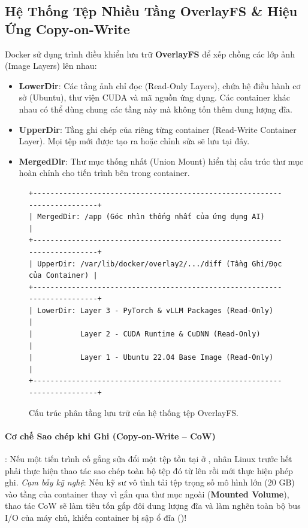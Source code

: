 \subsection{Hệ Thống Tệp Nhiều Tầng OverlayFS \& Hiệu Ứng Copy-on-Write}
Docker sử dụng trình điều khiển lưu trữ \textbf{OverlayFS} để xếp chồng các lớp ảnh (Image Layers) lên nhau:
\begin{itemize}
  \item \textbf{LowerDir}: Các tầng ảnh chỉ đọc (Read-Only Layers), chứa hệ điều hành cơ sở (Ubuntu), thư viện CUDA và mã nguồn ứng dụng. Các container khác nhau có thể dùng chung các tầng này mà không tốn thêm dung lượng đĩa.
  \item \textbf{UpperDir}: Tầng ghi chép của riêng từng container (Read-Write Container Layer). Mọi tệp mới được tạo ra hoặc chỉnh sửa sẽ lưu tại đây.
  \item \textbf{MergedDir}: Thư mục thống nhất (Union Mount) hiển thị cấu trúc thư mục hoàn chỉnh cho tiến trình bên trong container.
\end{itemize}

\begin{figure}[ht]
\centering
\small
\begin{verbatim}
+--------------------------------------------------------------------------+
| MergedDir: /app (Góc nhìn thống nhất của ứng dụng AI)                     |
+--------------------------------------------------------------------------+
| UpperDir: /var/lib/docker/overlay2/.../diff (Tầng Ghi/Đọc của Container) |
+--------------------------------------------------------------------------+
| LowerDir: Layer 3 - PyTorch & vLLM Packages (Read-Only)                  |
|           Layer 2 - CUDA Runtime & CuDNN (Read-Only)                     |
|           Layer 1 - Ubuntu 22.04 Base Image (Read-Only)                  |
+--------------------------------------------------------------------------+
\end{verbatim}
\caption{Cấu trúc phân tầng lưu trữ của hệ thống tệp OverlayFS.}
\label{fig:overlayfs-layers}
\end{figure}

\paragraph{Cơ chế Sao chép khi Ghi (Copy-on-Write -- CoW)}:
Nếu một tiến trình cố gắng sửa đổi một tệp tồn tại ở , nhân Linux trước hết phải thực hiện thao tác sao chép toàn bộ tệp đó từ  lên  rồi mới thực hiện phép ghi.
\textit{Cạm bẫy kỹ nghệ}: Nếu kỹ sư vô tình tải tệp trọng số mô hình lớn ($20\text{ GB}$) vào tầng của container thay vì gắn qua thư mục ngoài (\textbf{Mounted Volume}), thao tác CoW sẽ làm tiêu tốn gấp đôi dung lượng đĩa và làm nghẽn toàn bộ bus I/O của máy chủ, khiến container bị sập ổ đĩa ()!

